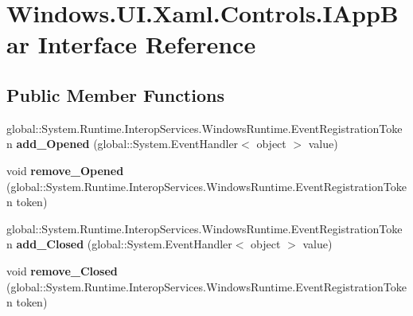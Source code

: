 \hypertarget{interface_windows_1_1_u_i_1_1_xaml_1_1_controls_1_1_i_app_bar}{}\section{Windows.\+U\+I.\+Xaml.\+Controls.\+I\+App\+Bar Interface Reference}
\label{interface_windows_1_1_u_i_1_1_xaml_1_1_controls_1_1_i_app_bar}
\subsection*{Public Member Functions}
\begin{DoxyCompactItemize}
\item 
\mbox{\label{interface_windows_1_1_u_i_1_1_xaml_1_1_controls_1_1_i_app_bar_aecc047b50b36b80b2863330dfdd6b5b1}} 
global\+::\+System.\+Runtime.\+Interop\+Services.\+Windows\+Runtime.\+Event\+Registration\+Token {\bfseries add\+\_\+\+Opened} (global\+::\+System.\+Event\+Handler$<$ object $>$ value)
\item 
\mbox{\label{interface_windows_1_1_u_i_1_1_xaml_1_1_controls_1_1_i_app_bar_a7b13adf7eea94bab04ff42899a53893e}} 
void {\bfseries remove\+\_\+\+Opened} (global\+::\+System.\+Runtime.\+Interop\+Services.\+Windows\+Runtime.\+Event\+Registration\+Token token)
\item 
\mbox{\label{interface_windows_1_1_u_i_1_1_xaml_1_1_controls_1_1_i_app_bar_ab262c6a2bdf436106c956695a7b223cd}} 
global\+::\+System.\+Runtime.\+Interop\+Services.\+Windows\+Runtime.\+Event\+Registration\+Token {\bfseries add\+\_\+\+Closed} (global\+::\+System.\+Event\+Handler$<$ object $>$ value)
\item 
\mbox{\label{interface_windows_1_1_u_i_1_1_xaml_1_1_controls_1_1_i_app_bar_a4d5a9d418800e1ab130394d9ff7e47eb}} 
void {\bfseries remove\+\_\+\+Closed} (global\+::\+System.\+Runtime.\+Interop\+Services.\+Windows\+Runtime.\+Event\+Registration\+Token token)
\item 
\mbox{\label{interface_windows_1_1_u_i_1_1_xaml_1_1_controls_1_1_i_app_bar_aecc047b50b36b80b2863330dfdd6b5b1}} 

\end{DoxyCompactItemize}
